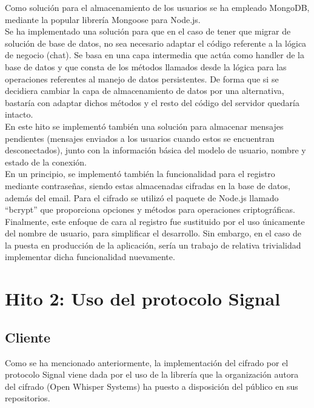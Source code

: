 Como solución para el almacenamiento de los usuarios se ha empleado MongoDB, mediante la popular librería Mongoose para Node.js. \\

Se ha implementado una solución para que en el caso de tener que migrar de solución de base de datos, no sea necesario adaptar el código referente a la lógica de negocio (chat). Se basa en una capa intermedia que actúa como handler de la base de datos y que consta de los métodos llamados desde la lógica para las operaciones referentes al manejo de datos persistentes. De forma que si se decidiera cambiar la capa de almacenamiento de datos por una alternativa, bastaría con adaptar dichos métodos y el resto del código del servidor quedaría intacto. \\ 

En este hito se implementó también una solución para almacenar mensajes pendientes (mensajes enviados a los usuarios cuando estos se encuentran desconectados), junto con la información básica del modelo de usuario, nombre y estado de la conexión. \\

En un principio, se implementó también la funcionalidad para el registro mediante contraseñas, siendo estas almacenadas cifradas en la base de datos, además del email. Para el cifrado se utilizó el paquete de Node.js llamado \hyphenquote{spanish}{bcrypt} que proporciona opciones y métodos para operaciones criptográficas. Finalmente, este enfoque de cara al registro fue sustituido por el uso únicamente del nombre de usuario, para simplificar el desarrollo. Sin embargo, en el caso de la puesta en producción de la aplicación, sería un trabajo de relativa trivialidad implementar dicha funcionalidad nuevamente. \\

\section{Hito 2: Uso del protocolo Signal}

\subsection{Cliente}

Como se ha mencionado anteriormente, la implementación del cifrado por el protocolo Signal viene dada por el uso de la librería que la organización autora del cifrado (Open Whisper Systems) ha puesto a disposición del público en sus repositorios. \\ 


